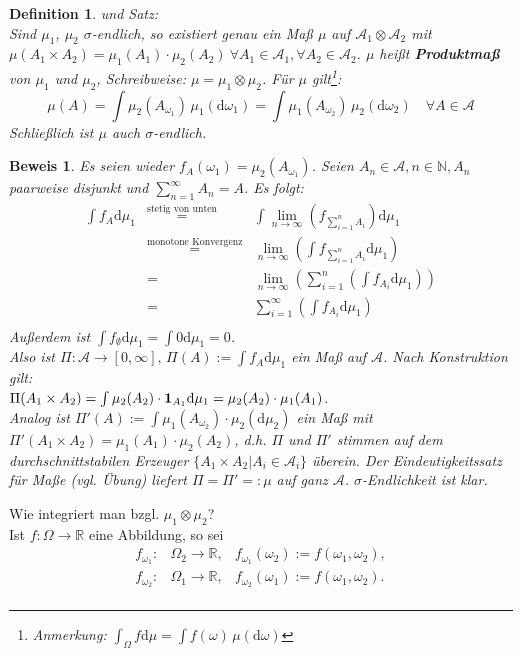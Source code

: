 \documentclass[a4paper,11pt]{book}
\newcommand{\R}{{\mathbb R}}
\newcommand{\N}{{\mathbb N}}
\newcommand{\ind}{\text{\bf{1}}}
\def\AA{ \mathcal{A} }
\def\d{\mbox{d}}
\newtheorem{Def}{Definition}[chapter]
\theoremstyle{nonumberplain}
\newtheorem{Bew}{Beweis}
\begin{document}
\begin{Def} und Satz: \label{Def3.1}\\
Sind $\mu_1$, $\mu_2$ $\sigma$-endlich, so existiert genau ein Maß $\mu$ auf $\AA_1\otimes\AA_2$ mit $\mu(A_1\times A_2)=\mu_1(A_1)\cdot\mu_2(A_2)\ \forall A_1\in\AA_1,\forall A_2\in\AA_2$. $\mu$ heißt \textbf{Produktmaß} von $\mu_1$ und $\mu_2$, Schreibweise: $\mu=\mu_1\otimes\mu_2$. Für $\mu$ gilt\footnote{Anmerkung: $\int_\Omega f\d\mu=\int f(\omega)\,\mu(\d\omega)$}: \\
\begin{displaymath}
\mu(A) = \int\mu_2(A_{\omega_1})\,\mu_1(\d\omega_1) = \int\mu_1(A_{\omega_2})\,\mu_2(\d\omega_2)\quad\forall A\in\AA
\end{displaymath}
Schließlich ist $\mu$ auch $\sigma$-endlich.
\end{Def}
\begin{Bew} Es seien wieder $f_A(\omega_1)=\mu_2(A_{\omega_1})$. Seien $A_n\in\AA, n\in\N, A_n$ paarweise disjunkt und $\sum_{n=1}^{\infty}A_n=A$. Es folgt:
\begin{eqnarray*}
\int f_A\d\mu_1 &\stackrel{\text{stetig von unten}}{=}& \int\lim_{n\to\infty}\left( f_{\sum_{i=1}^n A_i}\right)\d\mu_1 \\
 &\stackrel{\text{monotone Konvergenz}}{=}& \lim_{n\to\infty}\left(\int f_{\sum_{i=1}^n A_i}\d\mu_1\right) \\
 &=& \lim_{n\to\infty}\left(\sum_{i=1}^n\left(\int f_{A_i}\d\mu_1\right)\right) \\
 &=& \sum_{i=1}^{\infty}\left(\int f_{A_i}\d\mu_1\right) \\
\end{eqnarray*}
Außerdem ist $\int f_{\emptyset}\d\mu_1=\int 0\d\mu_1=0$. \\
Also ist $\Pi: \AA\to\left[0,\infty\right],\,\Pi(A):=\int f_A\d\mu_1$ ein Maß auf $\AA$. Nach Konstruktion gilt: \\
$\Pi(A_1\times A_2)=\int \mu_2(A_2)\cdot \ind_{A_1}\d\mu_1=\mu_2(A_2)\cdot\mu_1(A_1)$. \\
Analog ist $\Pi'(A):=\int\mu_1(A_{\omega_2})\cdot\mu_2(\d\mu_2)$ ein Maß mit $\Pi'(A_1\times A_2)=\mu_1(A_1)\cdot\mu_2(A_2)$, d.h. $\Pi$ und $\Pi'$ stimmen auf dem durchschnittstabilen Erzeuger $\{A_1\times A_2|A_i\in\AA_i\}$ überein. Der Eindeutigkeitssatz für Maße (vgl. Übung) liefert $\Pi=\Pi' =: \mu$ auf ganz $\AA$. $\sigma$-Endlichkeit ist klar.
\end{Bew}

Wie integriert man bzgl. $\mu_1\otimes\mu_2$? \\
Ist $f:\Omega\to\R$ eine Abbildung, so sei
\begin{eqnarray*}
f_{\omega_1}: & \Omega_2\to\R, & f_{\omega_1}\left(\omega_2\right):=f\left(\omega_1,\omega_2\right), \\
f_{\omega_2}: & \Omega_1\to\R, & f_{\omega_2}\left(\omega_1\right):=f\left(\omega_1,\omega_2\right). \\
\end{eqnarray*}
\end{document}
